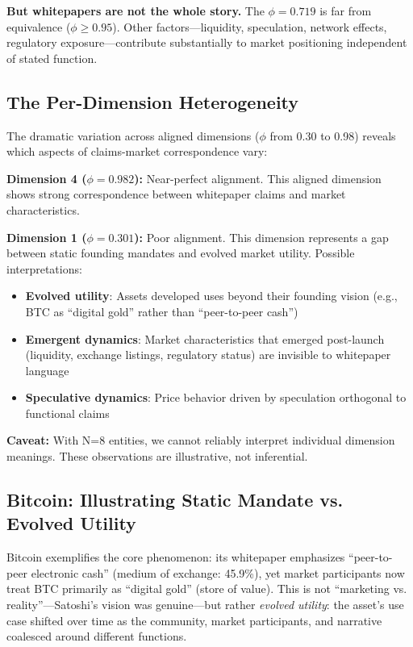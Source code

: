 \documentclass[11pt,twocolumn]{article}
\begin{document}
\textbf{But whitepapers are not the whole story.} The $\phi = 0.719$ is far from equivalence ($\phi \geq 0.95$). Other factors---liquidity, speculation, network effects, regulatory exposure---contribute substantially to market positioning independent of stated function.

\subsection{The Per-Dimension Heterogeneity}

The dramatic variation across aligned dimensions ($\phi$ from 0.30 to 0.98) reveals which aspects of claims-market correspondence vary:

\textbf{Dimension 4 ($\phi = 0.982$):} Near-perfect alignment. This aligned dimension shows strong correspondence between whitepaper claims and market characteristics.

\textbf{Dimension 1 ($\phi = 0.301$):} Poor alignment. This dimension represents a gap between static founding mandates and evolved market utility. Possible interpretations:
\begin{itemize}[leftmargin=*]
    \item \textbf{Evolved utility}: Assets developed uses beyond their founding vision (e.g., BTC as ``digital gold'' rather than ``peer-to-peer cash'')
    \item \textbf{Emergent dynamics}: Market characteristics that emerged post-launch (liquidity, exchange listings, regulatory status) are invisible to whitepaper language
    \item \textbf{Speculative dynamics}: Price behavior driven by speculation orthogonal to functional claims
\end{itemize}

\textbf{Caveat:} With N=8 entities, we cannot reliably interpret individual dimension meanings. These observations are illustrative, not inferential.

\subsection{Bitcoin: Illustrating Static Mandate vs. Evolved Utility}

Bitcoin exemplifies the core phenomenon: its whitepaper emphasizes ``peer-to-peer electronic cash'' (medium of exchange: 45.9\%), yet market participants now treat BTC primarily as ``digital gold'' (store of value). This is not ``marketing vs. reality''---Satoshi's vision was genuine---but rather \textit{evolved utility}: the asset's use case shifted over time as the community, market participants, and narrative coalesced around different functions.
\end{document}
